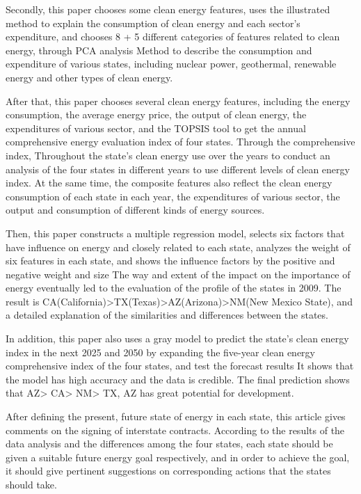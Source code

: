 \documentclass[a4paper]{article}
\begin{document}
Secondly, this paper chooses some clean energy features, uses the illustrated method to explain the consumption of clean energy and each sector's expenditure, and chooses 8 + 5 different categories of features related to clean energy, through PCA analysis Method to describe the consumption and expenditure of various states, including nuclear power, geothermal, renewable energy and other types of clean energy.

After that, this paper chooses several clean energy features, including the energy consumption, the average energy price, the output of clean energy, the expenditures of various sector, and the TOPSIS tool to get the annual comprehensive energy evaluation index of four states. Through the comprehensive index, Throughout the state's clean energy use over the years to conduct an analysis of the four states in different years to use different levels of clean energy index. At the same time, the composite features also reflect the clean energy consumption of each state in each year, the expenditures of various sector, the output and consumption of different kinds of energy sources.

Then, this paper constructs a multiple regression model, selects six factors that have influence on energy and closely related to each state, analyzes the weight of six features in each state, and shows the influence factors by the positive and negative weight and size The way and extent of the impact on the importance of energy eventually led to the evaluation of the profile of the states in 2009. The result is CA(California)>TX(Texas)>AZ(Arizona)>NM(New Mexico State), and a detailed explanation of the similarities and differences between the states.

In addition, this paper also uses a gray model to predict the state's clean energy index in the next 2025 and 2050 by expanding the five-year clean energy comprehensive index of the four states, and test the forecast results It shows that the model has high accuracy and the data is credible. The final prediction shows that AZ> CA> NM> TX, AZ has great potential for development.

After defining the present, future state of energy in each state, this article gives comments on the signing of interstate contracts. According to the results of the data analysis and the differences among the four states, each state should be given a suitable future energy goal respectively, and in order to achieve the goal, it should give pertinent suggestions on corresponding actions that the states should take.
\end{document}
